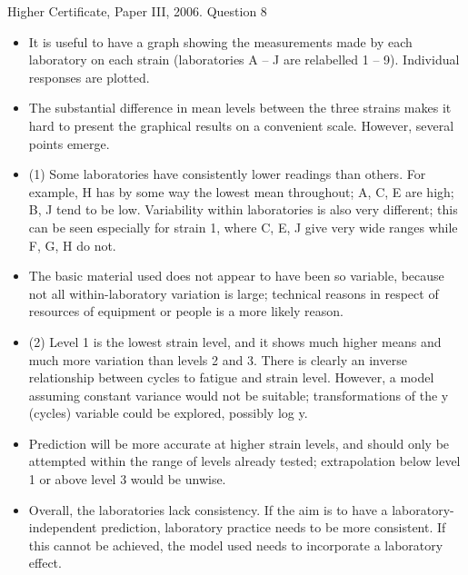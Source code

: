 \documentclass[a4paper,12pt]{article}
\begin{document}
Higher Certificate, Paper III, 2006. Question 8
\begin{itemize}
\item It is useful to have a graph showing the measurements made by each laboratory on each strain (laboratories A – J are relabelled 1 – 9). Individual responses are plotted.
\item The substantial difference in mean levels between the three strains makes it hard to present the graphical results on a convenient scale. However, several points emerge.
\item (1) Some laboratories have consistently lower readings than others. For example, H has by some way the lowest mean throughout; A, C, E are high; B, J tend to be low. Variability within laboratories is also very different; this can be seen especially for strain 1, where C, E, J give very wide ranges while F, G, H do not. 
\item The basic material used does not appear to have been so variable, because not all within-laboratory variation is large; technical reasons in respect of resources of equipment or people is a more likely reason.
\item (2) Level 1 is the lowest strain level, and it shows much higher means and much more variation than levels 2 and 3. There is clearly an inverse relationship between cycles to fatigue and strain level. However, a model assuming constant variance would not be suitable; transformations of the y (cycles) variable could be explored, possibly log y. \item Prediction will be more accurate at higher strain levels, and should only be attempted within the range of levels already tested; extrapolation below level 1 or above level 3 would be unwise.
\item Overall, the laboratories lack consistency. If the aim is to have a laboratory-independent prediction, laboratory practice needs to be more consistent. If this cannot be achieved, the model used needs to incorporate a laboratory effect.
 \end{itemize}
 
\end{document}
